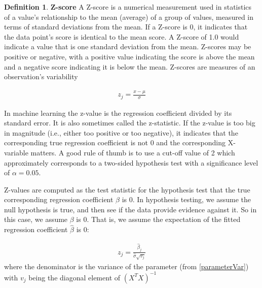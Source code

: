 \documentclass[12pt, letterpaper]{article}
\theoremstyle{definition}
\newtheorem{definition}{Definition}[section]
\begin{document}
\begin{definition}{\textbf{Z-score}}
A Z-score is a numerical measurement used in statistics of a value's relationship to the mean (average) of a group of values, measured in terms of standard deviations from the mean. If a Z-score is 0, it indicates that the data point's score is identical to the mean score. A Z-score of 1.0 would indicate a value that is one standard deviation from the mean. Z-scores may be positive or negative, with a positive value indicating the score is above the mean and a negative score indicating it is below the mean. Z-scores are measures of an observation's variability

\begin{align}
z_j=\frac{x - \mu}{\sigma}
\end{align}

In machine learning the z-value is the regression coefficient divided by its standard error. It is also sometimes called the z-statistic. If the z-value is too big in magnitude (i.e., either too positive or too negative), it indicates that the corresponding true regression coefficient is not 0 and the corresponding X-variable matters. A good rule of thumb is to use a cut-off value of 2 which approximately corresponds to a two-sided hypothesis test with a significance level of $\alpha=0.05$.

Z-values are computed as the test statistic for the hypothesis test that the true corresponding regression coefficient $\beta$ is $0$. In hypothesis testing, we assume the null hypothesis is true, and then see if the data provide evidence against it. So in this case, we assume $\beta$ is 0. That is, we assume the expectation of the fitted regression coefficient $\hat{\beta}$ is $0$:

\begin{align}
z_j =\frac{\hat{\beta}_j}{\hat{\sigma} \sqrt{v_j}}
\end{align}
where the denominator is the variance of the parameter (from \ref{parameterVar}) with $v_j$ being the diagonal element of $(X^TX)^{-1}$ 
\end{definition}
\end{document}
